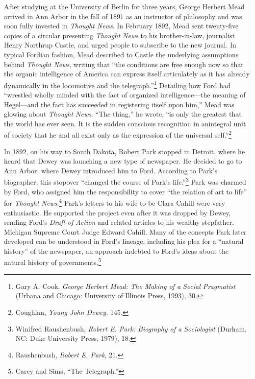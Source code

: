\documentclass[openany,nobib]{tufte-book}
\begin{document}
After studying at the University of Berlin for three years, George
Herbert Mead arrived in Ann Arbor in the fall of 1891 as an instructor
of philosophy and was soon fully invested in \emph{Thought News}. In
February 1892, Mead sent twenty-five copies of a circular presenting
\emph{Thought News} to his brother-in-law, journalist Henry Northrup
Castle, and urged people to subscribe to the new journal. In typical
Fordian fashion, Mead described to Castle the underlying assumptions
behind \emph{Thought News}, writing that ``the conditions are free
enough now so that the organic intelligence of America can express
itself articulately as it has already dynamically in the locomotive and
the telegraph.''\footnote{Gary A. Cook, \emph{George Herbert Mead: The
  Making of a Social Pragmatist} (Urbana and Chicago: University of
  Illinois Press, 1993), 30.} Detailing how Ford had ``wrestled wholly
minded with the fact of organized intelligence---the meaning of
Hegel---and the fact has succeeded in registering itself upon him,''
Mead was glowing about \emph{Thought News}. ``The thing,'' he wrote,
``is only the greatest that the world has ever seen. It is the sudden
conscious recognition in an\newpage\noindent integral unit of society that he and all
exist only as the expression of the universal self.''\footnote{Coughlan,
  \emph{Young John Dewey,} 145.}

In 1892, on his way to South Dakota, Robert Park stopped in Detroit,
where he heard that Dewey was launching a new type of newspaper. He
decided to go to Ann Arbor, where Dewey introduced him to Ford.
According to Park's biographer, this stopover ``changed the course of
Park's life.''\footnote{Winifred Raushenbush, \emph{Robert E. Park:
  Biography of a Sociologist} (Durham, NC: Duke University Press, 1979),
  18.} Park was charmed by Ford, who assigned him the responsibility to
cover ``the relation of art to life'' for \emph{Thought
News}.\footnote{Raushenbush, \emph{Robert E. Park}, 21.} Park's letters
to his wife-to-be Clara Cahill were very enthusiastic. He supported the
project even after it was dropped by Dewey, sending Ford's \emph{Draft
of Action} and related articles to his wealthy stepfather, Michigan
Supreme Court Judge Edward Cahill. Many of the concepts Park later
developed can be understood in Ford's lineage, including his plea for a
``natural history'' of the newspaper, an approach indebted to Ford's
ideas about the natural history of governments.\footnote{Carey and Sims,
  ``The Telegraph.''}
\end{document}
